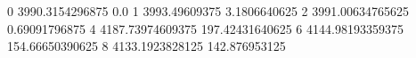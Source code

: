 0 3990.3154296875 0.0
1 3993.49609375 3.1806640625
2 3991.00634765625 0.69091796875
4 4187.73974609375 197.42431640625
6 4144.98193359375 154.66650390625
8 4133.1923828125 142.876953125
